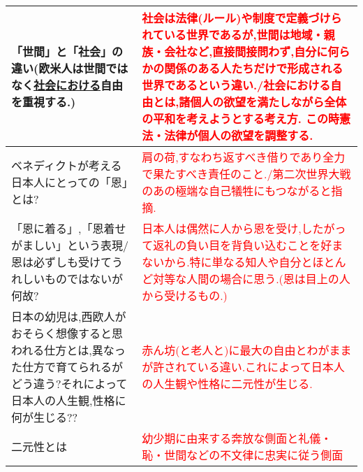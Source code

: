 \documentclass[a4paper,10pt]{article}
\begin{document}
\begin{longtable}{|p{}|p{}|}
    「世間」と「社会」の違い(欧米人は世間ではなく\underline{社会における}自由を重視する.) & \textcolor{red}{社会は法律(ルール)や制度で定義づけられている世界であるが,世間は地域・親族・会社など,直接間接問わず,自分に何らかの関係のある人たちだけで形成される世界であるという違い./社会における自由とは,諸個人の欲望を満たしながら全体の平和を考えようとする考え方. この時憲法・法律が個人の欲望を調整する.} \\ \hline
    ベネディクトが考える日本人にとっての「恩」とは? & \textcolor{red}{肩の荷,すなわち返すべき借りであり全力で果たすべき責任のこと./第二次世界大戦のあの極端な自己犠牲にもつながると指摘.} \\ \hline
    「恩に着る」,「恩着せがましい」という表現/恩は必ずしも受けてうれしいものではないが何故?& \textcolor{red}{日本人は偶然に人から恩を受け,したがって返礼の負い目を背負い込むことを好まないから.特に単なる知人や自分とほとんど対等な人間の場合に思う.(恩は目上の人から受けるもの.)} \\ \hline
    日本の幼児は,西欧人がおそらく想像すると思われる仕方とは,異なった仕方で育てられるがどう違う?それによって日本人の人生観,性格に何が生じる?? & \textcolor{red}{赤ん坊(と老人と)に最大の自由とわがままが許されている違い.これによって日本人の人生観や性格に二元性が生じる.} \\ \hline
    二元性とは & \textcolor{red}{幼少期に由来する奔放な側面と礼儀・恥・世間などの不文律に忠実に従う側面} \\ \hline
\end{longtable}
\end{document}
